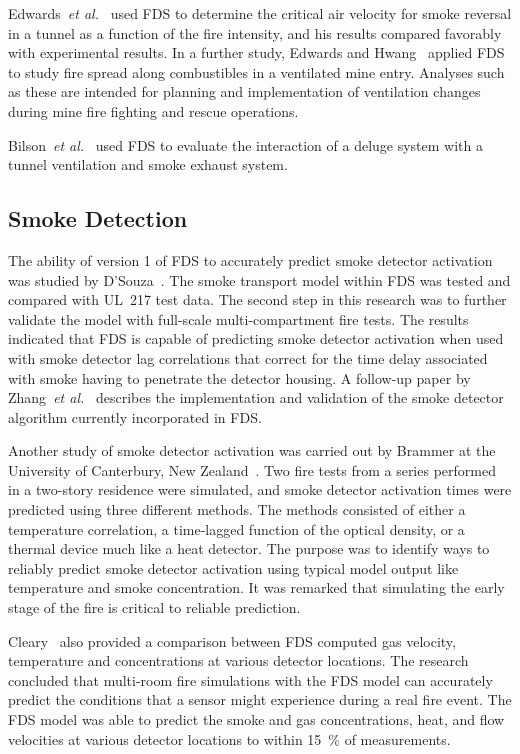 Edwards~{\em  et al.}~\cite{Edwards:SME2005,Edwards:FSJ}  used  FDS to determine the critical air velocity  for smoke reversal in a tunnel as a
function of  the fire intensity, and his  results compared favorably with   experimental  results.   In  a   further  study,   Edwards  and
Hwang~\cite{Edwards:SME2006}  applied FDS to  study fire  spread along combustibles in  a ventilated mine  entry. Analyses such as  these are
intended for planning and implementation of ventilation changes during mine fire fighting and rescue operations.

Bilson~{\em et al.}~\cite{Bilson:2008} used FDS to evaluate the interaction of a deluge system with a tunnel
ventilation and smoke exhaust system.




\subsection{Smoke Detection}

The ability of  version 1 of FDS to  accurately predict smoke detector activation was studied by D'Souza~\cite{DSouza:1}. The smoke transport model
within FDS  was tested and compared with UL~217 test data.  The second step  in this research was  to further validate  the model with full-scale
multi-compartment fire tests.  The results  indicated that FDS is capable of predicting  smoke detector activation when used with smoke  detector
lag correlations  that  correct  for  the time  delay associated with smoke having to penetrate the detector housing. A follow-up paper by
Zhang~{\em et al.}~\cite{Zhang:FSJ2008} describes the implementation and validation of the smoke detector algorithm currently incorporated in FDS.

Another study of smoke detector  activation was carried out by Brammer at  the University  of Canterbury,  New  Zealand~\cite{Brammer:1}. Two fire
tests from  a series  performed  in a  two-story residence  were simulated, and  smoke detector  activation times were  predicted using three
different methods. The methods consisted of either a temperature correlation,  a time-lagged  function  of the  optical  density, or  a thermal
device much like a heat detector.  The purpose was to identify ways to reliably predict smoke detector activation using typical model output like
temperature and  smoke concentration. It was remarked that simulating  the  early stage  of  the  fire  is critical  to  reliable prediction.

Cleary~\cite{Cleary:1} also provided a comparison between FDS computed gas  velocity,  temperature  and  concentrations at  various  detector
locations.   The research concluded  that multi-room  fire simulations with the FDS model can accurately predict the conditions that a sensor might
experience during a real fire  event.  The FDS model was able to predict the smoke and gas concentrations, heat, and flow velocities at various
detector locations to within 15~\% of measurements.


